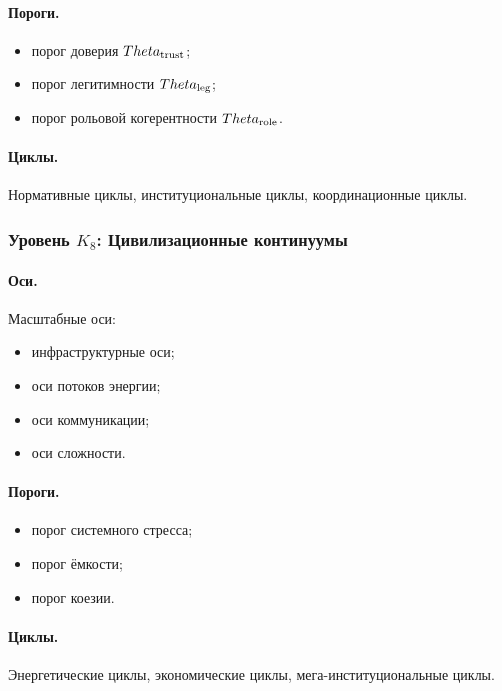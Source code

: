 \paragraph{Пороги.}
\begin{itemize}
    \item порог доверия \(\Theta_{\rm trust}\);
    \item порог легитимности \(\Theta_{\rm leg}\);
    \item порог рольовой когерентности \(\Theta_{\rm role}\).
\end{itemize}

\paragraph{Циклы.}
Нормативные циклы, институциональные циклы, координационные циклы.

\subsubsection{Уровень \texorpdfstring{\(K_8\)}{K8}: Цивилизационные континуумы}

\paragraph{Оси.}
Масштабные оси:
\begin{itemize}
    \item инфраструктурные оси;
    \item оси потоков энергии;
    \item оси коммуникации;
    \item оси сложности.
\end{itemize}

\paragraph{Пороги.}
\begin{itemize}
    \item порог системного стресса;
    \item порог ёмкости;
    \item порог коезии.
\end{itemize}

\paragraph{Циклы.}
Энергетические циклы, экономические циклы, мега-институциональные циклы.


